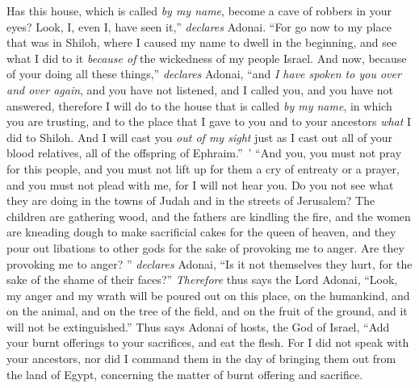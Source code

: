 \begin{biblechapter}
\verse Has this house, which is called \textit{by my name}, become a cave of robbers in your eyes? Look, I, even I, have seen it,”  \textit{declares} Adonai.
\verse “For go now to my place that was in Shiloh, where I caused my name to dwell in the beginning, and see what I did to it \textit{because of} the wickedness of my people Israel.
\verse And now, because of your doing all these things,” \textit{declares} Adonai, “and \textit{I have spoken to you over and over again}, and you have not listened, and I called you, and you have not answered,
\verse therefore I will do to the house that is called \textit{by my name}, in which you are trusting, and to the place that I gave to you and to your ancestors \textit{what} I did to Shiloh.
\verse And I will cast you \textit{out of my sight} just as I cast out all of your blood relatives, all of the offspring of Ephraim.” ’
\verse “And you, you must not pray for this people, and you must not lift up for them a cry of entreaty or a prayer, and you must not plead with me, for I will not hear you.
\verse Do you not see what they are doing in the towns of Judah and in the streets of Jerusalem?
\verse The children are gathering wood, and the fathers are kindling the fire, and the women are kneading dough to make sacrificial cakes for the queen of heaven, and they pour out libations to other gods for the sake of provoking me to anger.
\verse Are they provoking me to anger? ” \textit{declares} Adonai, “Is it not themselves they hurt, for the sake of the shame of their faces?”
\verse \textit{Therefore} thus says the Lord Adonai, “Look, my anger and my wrath will be poured out on this place, on the humankind, and on the animal, and on the tree of the field, and on the fruit of the ground, and it will not be extinguished.”
\verse Thus says Adonai of hosts, the God of Israel, “Add your burnt offerings to your sacrifices, and eat the flesh.
\verse For I did not speak with your ancestors, nor did I command them in the day of bringing them out from the land of Egypt, concerning the matter of burnt offering and sacrifice.

\end{biblechapter}
